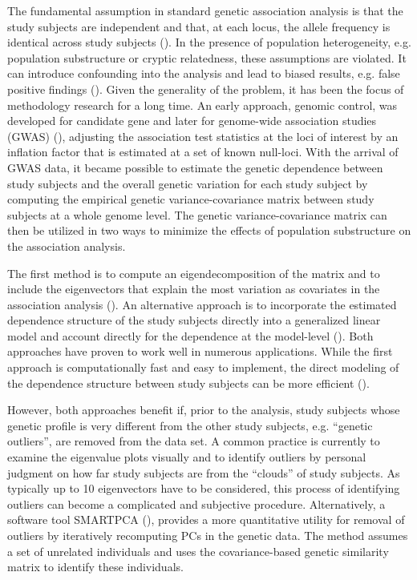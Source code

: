 The fundamental assumption in standard genetic association analysis
is that the study subjects are independent and that, at each locus,
the allele frequency is identical across study subjects (\citealp{choi2009case,purcell2007plink,yang2010common}).
In the presence of population heterogeneity, e.g. population substructure
or cryptic relatedness, these assumptions are violated. It can introduce
confounding into the analysis and lead to biased results, e.g. false
positive findings (\citealp{price2006principal,kang2010variance,ptak2002evidence,voight2005confounding}).
Given the generality of the problem, it has been the focus of methodology
research for a long time. An early approach, genomic control, was developed for candidate gene and later for genome-wide association studies (GWAS)  (\citealp{devlin2001genomic,bacanu2002association}), adjusting the association test statistics at the loci of
interest by an inflation factor that is estimated at a set of known
null-loci. With the arrival of GWAS data, it became possible to estimate
the genetic dependence between study subjects and the overall genetic
variation for each study subject by computing the empirical genetic
variance-covariance matrix between study subjects at a whole genome
level. The genetic variance-covariance matrix can then be utilized
in two ways to minimize the effects of population substructure on
the association analysis. 

The first method is to compute an eigendecomposition of the matrix
and to include the eigenvectors that explain the most variation as
covariates in the association analysis (\citealp{price2006principal,price2010new}).
An alternative approach is to incorporate the estimated dependence
structure of the study subjects directly into a generalized linear
model and account directly for the dependence at the model-level (\citealp{listgarten2012improved,lippert2011fast,zhang2010mixed}).
Both approaches have proven to work well in numerous applications.
While the first approach is computationally fast and easy to implement,
the direct modeling of the dependence structure between study subjects
can be more efficient (\citealp{mathieson2012differential}). 

However, both approaches benefit if, prior to the analysis, study
subjects whose genetic profile is very different from the other study
subjects, e.g. ``genetic outliers'',
are removed from the data set. A common practice is currently
to examine the eigenvalue plots visually and to identify outliers
by personal judgment on how far study subjects are from the ``clouds''
of study subjects. As typically up to 10 eigenvectors have to be considered,
this process of identifying outliers can become a complicated and
subjective procedure. Alternatively, a software tool SMARTPCA (\citealp{patterson2006population}), provides a more quantitative utility for removal of outliers by iteratively recomputing PCs in the genetic data.  The method assumes a set of unrelated individuals and uses the covariance-based genetic similarity matrix to identify these individuals.

